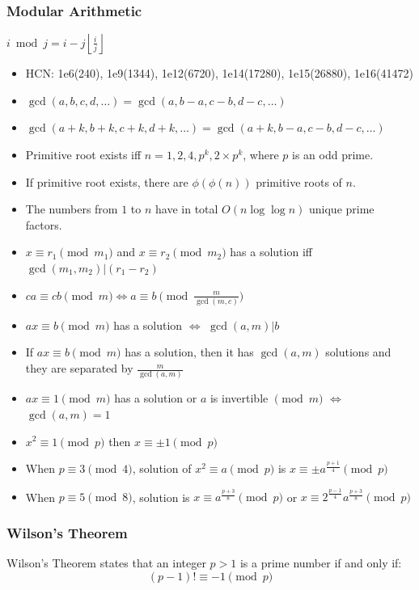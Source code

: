 \subsubsection{Modular Arithmetic}
$i \bmod j = i - j\left\lfloor \frac{i}{j} \right\rfloor$
\begin{itemize}
  \item HCN: 1e6(240), 1e9(1344), 1e12(6720), 1e14(17280), 1e15(26880), 1e16(41472)
  \item \( \gcd(a, b, c, d, \dots) = \gcd(a, b - a, c - b, d - c, \dots) \)
  \item \( \gcd(a + k, b + k, c + k, d + k, \dots) = \gcd(a + k, b - a, c - b, d - c, \dots) \)
  \item Primitive root exists iff \( n = 1, 2, 4, p^k, 2\times p^k \), where \( p \) is an odd prime.
  \item If primitive root exists, there are \( \phi(\phi(n)) \) primitive roots of \( n \).
  \item The numbers from \( 1 \) to \( n \) have in total \( O(n\log\log n) \) unique prime factors.
  \item \( x \equiv r_1 \pmod{m_1} \) and \( x \equiv r_2 \pmod{m_2} \) has a solution iff \( \gcd(m_1, m_2) | (r_1 - r_2) \)
  \item \( ca \equiv cb \pmod{m} \iff a \equiv b \pmod{ \frac{m}{\gcd(m, c)}} \)
  \item \( ax \equiv b \pmod{m} \) has a solution \( \iff \) \( \gcd(a, m) | b \)
  \item If \( ax \equiv b \pmod{m} \) has a solution, then it has \( \gcd(a, m) \) solutions and they are separated by \( \frac{m}{\gcd(a, m)} \)
  \item \( ax \equiv 1 \pmod{m} \) has a solution or \( a \) is invertible \( \pmod{m} \) \( \iff \) \(\gcd(a, m) = 1 \)
  \item \( x^2 \equiv 1 \pmod{p} \) then \( x \equiv \pm 1 \pmod{p} \)
  \item When \( p \equiv 3 \pmod 4 \), solution of \( x^2 \equiv a \pmod p \) is \( x \equiv \pm a^{\frac{p + 1}{4}} \pmod p \)
  \item When \( p \equiv 5 \pmod 8 \), solution is \( x \equiv a^{\frac{p + 3}{8}} \pmod p \) or \( x \equiv 2^{\frac{p - 1}{4}} a^{\frac{p + 3}{8}} \pmod p \)
\end{itemize}

\subsubsection{Wilson's Theorem}
Wilson's Theorem states that an integer $p > 1$ is a prime number if and only if:
$$(p - 1)! \equiv -1 \pmod{p}$$

